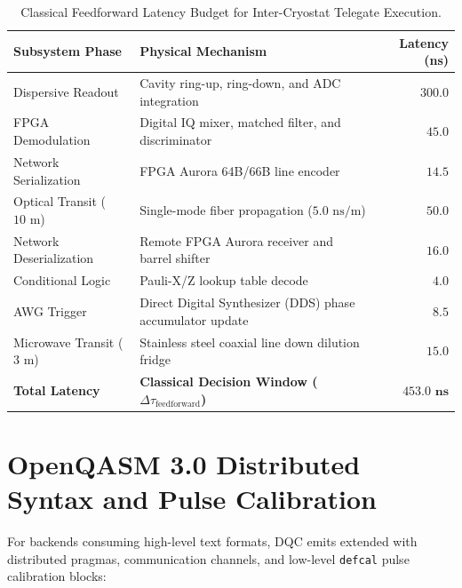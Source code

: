 \begin{table}[htbp]
\centering
\small
\caption{Classical Feedforward Latency Budget for Inter-Cryostat Telegate Execution.}
\label{tab:classical_feedforward_latency_budget}
\begin{tabular}{llr}
\toprule
\textbf{Subsystem Phase} & \textbf{Physical Mechanism} & \textbf{Latency (ns)} \\
\midrule
Dispersive Readout & Cavity ring-up, ring-down, and ADC integration & $300.0$ \\
FPGA Demodulation & Digital IQ mixer, matched filter, and discriminator & $45.0$ \\
Network Serialization & FPGA Aurora 64B/66B line encoder & $14.5$ \\
Optical Transit ($10\text{ m}$) & Single-mode fiber propagation ($5.0\text{ ns/m}$) & $50.0$ \\
Network Deserialization & Remote FPGA Aurora receiver and barrel shifter & $16.0$ \\
Conditional Logic & Pauli-X/Z lookup table decode & $4.0$ \\
AWG Trigger & Direct Digital Synthesizer (DDS) phase accumulator update & $8.5$ \\
Microwave Transit ($3\text{ m}$) & Stainless steel coaxial line down dilution fridge & $15.0$ \\
\midrule
\textbf{Total Latency} & \textbf{Classical Decision Window ($\Delta \tau_{\text{feedforward}}$)} & \textbf{$\mathbf{453.0\text{ ns}}$} \\
\bottomrule
\end{tabular}
\end{table}

\section{OpenQASM 3.0 Distributed Syntax and Pulse Calibration}
\label{sec:openqasm_lowering}

For backends consuming high-level text formats, DQC emits  extended with distributed pragmas, communication channels, and low-level \texttt{defcal} pulse calibration blocks:

